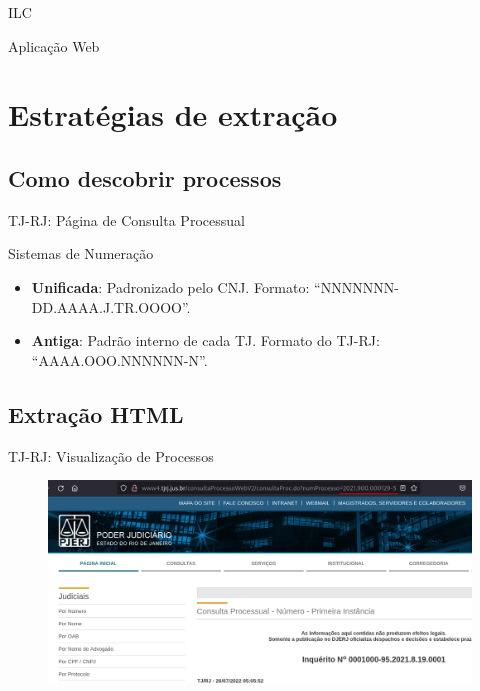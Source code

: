 \begin{frame}{ILC}
    \todo{}
\end{frame}

\begin{frame}{Aplicação Web}
    \todo{:)}
\end{frame}

\section{Estratégias de extração}

\subsection{Como descobrir processos}

\begin{frame}{TJ-RJ: Página de Consulta Processual}
\end{frame}

\begin{frame}{Sistemas de Numeração}
    \begin{itemize}
        \item \textbf{Unificada}: Padronizado pelo CNJ. Formato:
            ``NNNNNNN-DD.AAAA.J.TR.OOOO''.
        \item \textbf{Antiga}: Padrão interno de cada TJ. Formato do TJ-RJ:
            ``AAAA.OOO.NNNNNN-N''.
    \end{itemize}
\end{frame}

\subsection{Extração HTML}

\begin{frame}{TJ-RJ: Visualização de Processos}
    \begin{figure}[htb]
        \includegraphics[keepaspectratio,width=1\textwidth]{img/tj-rj-1}
    \end{figure}
\end{frame}

